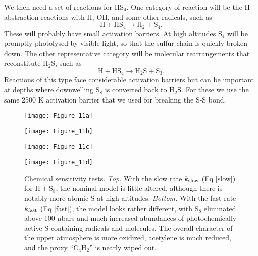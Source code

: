 \documentclass[preprint]{aastex6}
\newcounter{reaction}
\begin{document}
We then need a set of reactions for HS$_4$.
One category of reaction will be the H-abstraction reactions with H, OH, and some other radicals, such as
\begin{equation}
\mathrm{H} + \mathrm{HS}_4 \rightarrow \mathrm{H}_2 + \mathrm{S}_4 .
\end{equation}
These will probably have small activation barriers.
At high altitudes S$_4$ will be promptly photolysed by visible light, so that the sulfur chain is quickly broken down. 
 The other representative category will be molecular rearrangements that reconstitute H$_2$S, such as
 \begin{equation}
\mathrm{H} + \mathrm{HS}_4 \rightarrow \mathrm{H}_2\mathrm{S} + \mathrm{S}_3 .
\end{equation}
 Reactions of this type face considerable activation barriers but can be important at depths
 where downwelling S$_8$ is converted back to H$_2$S.
 For these we use the same 2500 K activation barrier that we used for breaking the S-S bond. 
   
\begin{figure}[!htb]
 \centering
 \begin{minipage}[c]{0.49\textwidth}
   \centering
  \texttt{[image: Figure\_11a]} 
 \end{minipage}
 \begin{minipage}[c]{0.49\textwidth}
   \centering
 \texttt{[image: Figure\_11b]} 
 \end{minipage}
 \centering
 \begin{minipage}[c]{0.49\textwidth}
   \centering
 \texttt{[image: Figure\_11c]} 
 \end{minipage}
 \begin{minipage}[c]{0.49\textwidth}
   \centering
 \texttt{[image: Figure\_11d]} 
 \end{minipage}
 \caption{\small Chemical sensitivity tests.  {\it Top.} With the slow rate $k_{\rm slow}$ (Eq \ref{slow}) for 
$\mathrm{H} + \mathrm{S}_8$, the nominal model is little altered, although there is notably more atomic S at high altitudes.
  {\it Bottom.} With the fast rate $k_{\rm fast}$ (Eq \ref{fast}), the model looks rather different, with S$_8$ eliminated above 100 $\mu$bars
  and much increased abundances of photochemically active S-containing radicals and molecules.  The overall character
  of the upper atmosphere is more oxidized, acetylene is much reduced, and the proxy ``C$_4$H$_2$'' is nearly wiped out. }
\label{4Sensitivity}
\end{figure}
\end{document}
